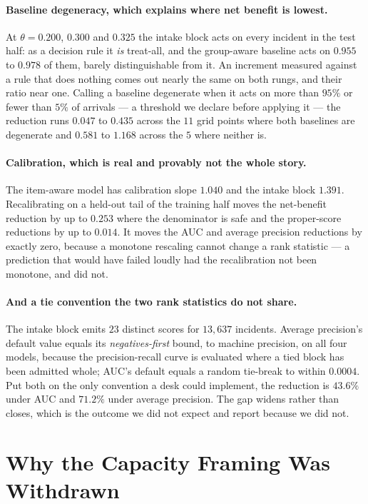 \documentclass[preprint,12pt]{elsarticle}
\begin{document}
\paragraph{Baseline degeneracy, which explains where net benefit is lowest.}
At $\theta = 0.200$, $0.300$ and $0.325$ the intake block acts on every
incident in the test half: as a decision rule it \emph{is} treat-all, and the
group-aware baseline acts on $0.955$ to $0.978$ of them, barely
distinguishable from it.
An increment measured against a rule that does nothing comes out nearly the
same on both rungs, and their ratio near one. Calling a baseline degenerate
when it acts on more than $95\%$ or fewer than $5\%$ of arrivals --- a
threshold we declare before applying it --- the reduction runs $0.047$ to
$0.435$ across the $11$ grid points where both baselines are degenerate and
$0.581$ to $1.168$ across the $5$ where neither is.

\paragraph{Calibration, which is real and provably not the whole story.}
The item-aware model has calibration slope $1.040$ and the intake block
$1.391$. Recalibrating on a held-out tail of the training half moves the
net-benefit reduction by up to $0.253$ where the denominator is safe and the
proper-score reductions by up to $0.014$. It moves the AUC and average
precision reductions by exactly zero, because a monotone rescaling cannot
change a rank statistic --- a prediction that would have failed loudly had the
recalibration not been monotone, and did not.

\paragraph{And a tie convention the two rank statistics do not share.}
The intake block emits $23$ distinct scores for $13{,}637$ incidents.
Average precision's default value equals its \emph{negatives-first} bound, to
machine precision, on all four models, because the precision-recall curve is
evaluated where a tied block has been admitted whole; AUC's default equals a
random tie-break to within $0.0004$. Put both on the only convention a desk
could implement, the reduction is $43.6\%$ under AUC and $71.2\%$ under
average precision. The gap widens rather than closes, which is the outcome we
did not expect and report because we did not.

\section{Why the Capacity Framing Was Withdrawn}
\label{app:capacity}
\label{sec:withdrawn}
\end{document}
